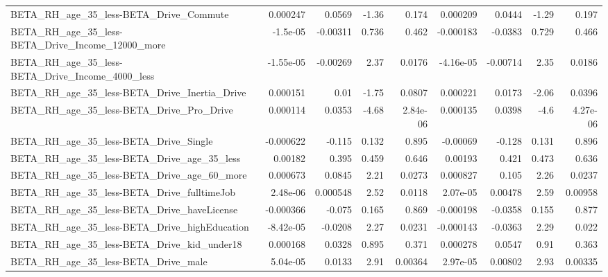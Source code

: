 \begin{tabular}{lrrrrrrrr}
BETA\_RH\_age\_35\_less-BETA\_Drive\_Commute             &    0.000247 &       0.0569 &    -1.36 &    0.174 &   0.000209 &      0.0444 &        -1.29 &         0.197 \\
BETA\_RH\_age\_35\_less-BETA\_Drive\_Income\_12000\_more   &    -1.5e-05 &     -0.00311 &    0.736 &    0.462 &  -0.000183 &     -0.0383 &        0.729 &         0.466 \\
BETA\_RH\_age\_35\_less-BETA\_Drive\_Income\_4000\_less    &   -1.55e-05 &     -0.00269 &     2.37 &   0.0176 &  -4.16e-05 &    -0.00714 &         2.35 &        0.0186 \\
BETA\_RH\_age\_35\_less-BETA\_Drive\_Inertia\_Drive       &    0.000151 &         0.01 &    -1.75 &   0.0807 &   0.000221 &      0.0173 &        -2.06 &        0.0396 \\
BETA\_RH\_age\_35\_less-BETA\_Drive\_Pro\_Drive           &    0.000114 &       0.0353 &    -4.68 & 2.84e-06 &   0.000135 &      0.0398 &         -4.6 &      4.27e-06 \\
BETA\_RH\_age\_35\_less-BETA\_Drive\_Single              &   -0.000622 &       -0.115 &    0.132 &    0.895 &   -0.00069 &      -0.128 &        0.131 &         0.896 \\
BETA\_RH\_age\_35\_less-BETA\_Drive\_age\_35\_less         &     0.00182 &        0.395 &    0.459 &    0.646 &    0.00193 &       0.421 &        0.473 &         0.636 \\
BETA\_RH\_age\_35\_less-BETA\_Drive\_age\_60\_more         &    0.000673 &       0.0845 &     2.21 &   0.0273 &   0.000827 &       0.105 &         2.26 &        0.0237 \\
BETA\_RH\_age\_35\_less-BETA\_Drive\_fulltimeJob         &    2.48e-06 &     0.000548 &     2.52 &   0.0118 &   2.07e-05 &     0.00478 &         2.59 &       0.00958 \\
BETA\_RH\_age\_35\_less-BETA\_Drive\_haveLicense         &   -0.000366 &       -0.075 &    0.165 &    0.869 &  -0.000198 &     -0.0358 &        0.155 &         0.877 \\
BETA\_RH\_age\_35\_less-BETA\_Drive\_highEducation       &   -8.42e-05 &      -0.0208 &     2.27 &   0.0231 &  -0.000143 &     -0.0363 &         2.29 &         0.022 \\
BETA\_RH\_age\_35\_less-BETA\_Drive\_kid\_under18         &    0.000168 &       0.0328 &    0.895 &    0.371 &   0.000278 &      0.0547 &         0.91 &         0.363 \\
BETA\_RH\_age\_35\_less-BETA\_Drive\_male                &    5.04e-05 &       0.0133 &     2.91 &  0.00364 &   2.97e-05 &     0.00802 &         2.93 &       0.00335 \\

\end{tabular}
